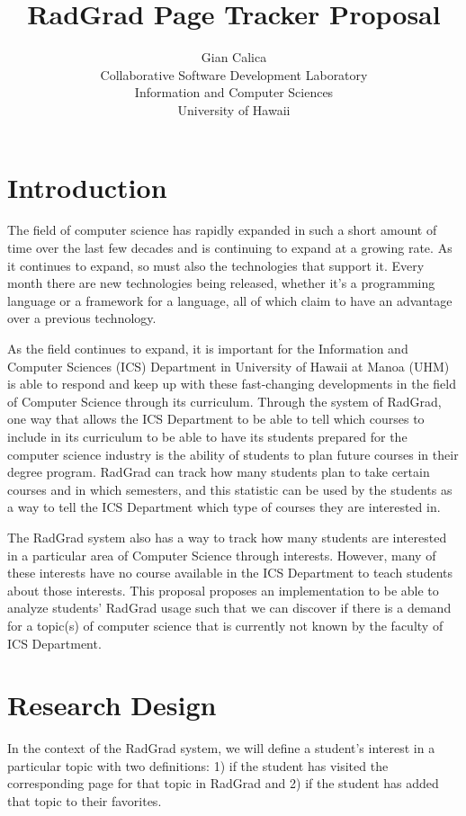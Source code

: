 \documentclass[english]{proposalnsf}
\title{RadGrad Page Tracker Proposal}
\author{Gian Calica \\Collaborative Software Development Laboratory \\ Information and Computer Sciences \\ University of Hawaii}
\begin{document}
  \maketitle
  \tableofcontents
  \newpage

  \section{Introduction}
  \label{sec:introduction}
  The field of computer science has rapidly expanded in such a short amount of time over the last few decades and is
  continuing to expand at a growing rate.
  As it continues to expand, so must also the technologies that support it.
  Every month there are new technologies being released, whether it's a programming language or a framework for a
  language, all of which claim to have an advantage over a previous technology.

  As the field continues to expand, it is important for the Information and Computer Sciences (ICS) Department in University of Hawaii at Manoa (UHM) is able to respond and keep up with these fast-changing developments in the field of Computer Science through its curriculum. Through the system of RadGrad, one way that allows the ICS Department to be able to tell which courses to include in its curriculum to be able to have its students prepared for the computer science industry is the ability of students to plan future courses in their degree program. RadGrad can track how many students plan to take certain courses and in which semesters, and this statistic can be used by the students as a way to tell the ICS Department which type of courses they are interested in.

  The RadGrad system also has a way to track how many students are interested in a particular area of Computer Science through interests. However, many of these interests have no course available in the ICS Department to teach students about those interests. This proposal proposes an implementation to be able to analyze students' RadGrad usage such that we can discover if there is a demand for a topic(s) of computer science that is currently not known by the faculty of ICS Department.

  \section{Research Design}
  \label{sec:research-design}

  In the context of the RadGrad system, we will define a student's interest in a particular topic with two definitions: 1) if the student has visited the corresponding page for that topic in RadGrad and 2) if the student has added that topic to their favorites.
\end{document}
